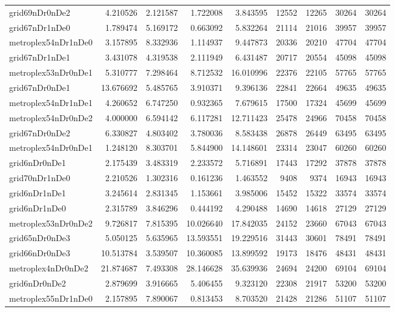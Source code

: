 \begin{longtable}{|l|r|r|r|r|r|r|r|r|}
grid69nDr0nDe2 & 4.210526 & 2.121587 & 1.722008 & 3.843595 & 12552 & 12265 & 30264 & 30264 \\
grid67nDr1nDe0 & 1.789474 & 5.169172 & 0.663092 & 5.832264 & 21114 & 21016 & 39957 & 39957 \\
metroplex54nDr1nDe0 & 3.157895 & 8.332936 & 1.114937 & 9.447873 & 20336 & 20210 & 47704 & 47704 \\
grid67nDr1nDe1 & 3.431078 & 4.319538 & 2.111949 & 6.431487 & 20717 & 20554 & 45098 & 45098 \\
metroplex53nDr0nDe1 & 5.310777 & 7.298464 & 8.712532 & 16.010996 & 22376 & 22105 & 57765 & 57765 \\
grid67nDr0nDe1 & 13.676692 & 5.485765 & 3.910371 & 9.396136 & 22841 & 22664 & 49635 & 49635 \\
metroplex54nDr1nDe1 & 4.260652 & 6.747250 & 0.932365 & 7.679615 & 17500 & 17324 & 45699 & 45699 \\
metroplex54nDr0nDe2 & 4.000000 & 6.594142 & 6.117281 & 12.711423 & 25478 & 24966 & 70458 & 70458 \\
grid67nDr0nDe2 & 6.330827 & 4.803402 & 3.780036 & 8.583438 & 26878 & 26449 & 63495 & 63495 \\
metroplex54nDr0nDe1 & 1.248120 & 8.303701 & 5.844900 & 14.148601 & 23314 & 23047 & 60260 & 60260 \\
grid6nDr0nDe1 & 2.175439 & 3.483319 & 2.233572 & 5.716891 & 17443 & 17292 & 37878 & 37878 \\
grid70nDr1nDe0 & 2.210526 & 1.302316 & 0.161236 & 1.463552 & 9408 & 9374 & 16943 & 16943 \\
grid6nDr1nDe1 & 3.245614 & 2.831345 & 1.153661 & 3.985006 & 15452 & 15322 & 33574 & 33574 \\
grid6nDr1nDe0 & 2.315789 & 3.846296 & 0.444192 & 4.290488 & 14690 & 14618 & 27129 & 27129 \\
metroplex53nDr0nDe2 & 9.726817 & 7.815395 & 10.026640 & 17.842035 & 24152 & 23660 & 67043 & 67043 \\
grid65nDr0nDe3 & 5.050125 & 5.635965 & 13.593551 & 19.229516 & 31443 & 30601 & 78491 & 78491 \\
grid66nDr0nDe3 & 10.513784 & 3.539507 & 10.360085 & 13.899592 & 19173 & 18476 & 48431 & 48431 \\
metroplex4nDr0nDe2 & 21.874687 & 7.493308 & 28.146628 & 35.639936 & 24694 & 24200 & 69104 & 69104 \\
grid6nDr0nDe2 & 2.879699 & 3.916665 & 5.406455 & 9.323120 & 22308 & 21917 & 53200 & 53200 \\
metroplex55nDr1nDe0 & 2.157895 & 7.890067 & 0.813453 & 8.703520 & 21428 & 21286 & 51107 & 51107 \\

\end{longtable}
